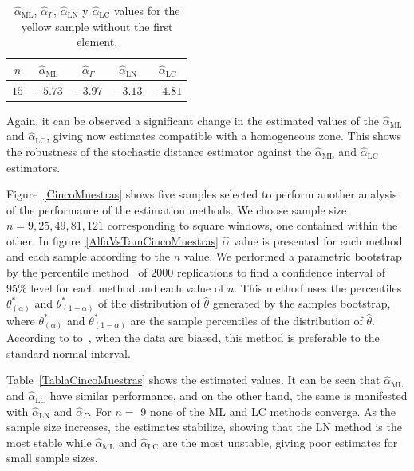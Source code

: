 \documentclass[twocolumn]{svjour3}
\begin{document}
\begin{table}[hbt]
	\centering
	\caption{\label{SinPrimero} $\widehat{\alpha}_{\text{{ML}}}$, $\widehat{\alpha}_{\Gamma}$, $\widehat{\alpha}_{\text{{LN}}}$ y $\widehat{\alpha}_{\text{{LC}}}$ values for the yellow sample without the first element.}
	\begin{tabular}{c*4{c}}
		\toprule
		$n$    &  $\widehat{\alpha}_{\text{{ML}}}$    &  $\widehat{\alpha}_{\Gamma}$  &  $\widehat{\alpha}_{\text{{LN}}}$ &  $\widehat{\alpha}_{\text{{LC}}}$\\
		\midrule
		$15$  & $-5.73$   & $-3.97$    & $-3.13$    & $-4.81$\\
		\bottomrule
	\end{tabular}
\end{table}

Again, it can be observed a significant change in the estimated values of the $\widehat{\alpha}_{\text{{ML}}}$ and $\widehat{\alpha}_{\text{{LC}}}$, giving now estimates compatible with a homogeneous zone. This shows the robustness of the stochastic distance estimator against the $\widehat{\alpha}_{\text{{ML}}}$ and $\widehat{\alpha}_{\text{{LC}}}$ estimators.

Figure~\ref{CincoMuestras} shows five samples selected to perform another analysis of the performance of the estimation methods. We choose sample size $n=9,25,49,81,121$ corresponding to square windows, one contained within the other. In figure~\ref{AlfaVsTamCincoMuestras} $\widehat{\alpha}$ value is presented for each method and each sample according to the $n$ value. 
We performed a parametric bootstrap by the percentile method~\cite{Davison1997} of $2000 $ replications to find a confidence interval of $95\%$ level for each method and each value of $n$. 	This method uses the percentiles $\theta^*_{(\alpha)}$ and $\theta^*_{(1-\alpha)}$ of the distribution of $\widehat{\theta} $ generated by the samples bootstrap, where $\theta^*_{(\alpha)}$ and $\theta^*_{(1-\alpha)}$ are the sample percentiles of the distribution of $\widehat{\theta} $. According to to~\cite{Efron93}, when the data are biased, this method is preferable to the standard normal interval. 

Table~\ref{TablaCincoMuestras} shows the estimated values. It can be seen that $\widehat{\alpha}_{\text{{ML}}}$ and $\widehat{\alpha}_{\text{{LC}}}$ have similar performance, and on the other hand, the same is manifested with $\widehat{\alpha}_{\text{{LN}}}$ and $\widehat{\alpha}_{\Gamma}$. For $n=$ 9 none of the ML and LC methods converge. As the sample size increases, the estimates stabilize, showing that the LN method is the most stable while $\widehat{\alpha}_{\text{{ML}}}$ and $\widehat{\alpha}_{\text{{LC}}}$ are the most unstable, giving poor estimates for small sample sizes.
\end{document}
